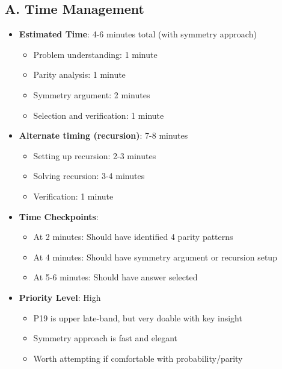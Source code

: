 \documentclass[12pt]{article}
\begin{document}
\begin{competitionbox}
\subsection*{A. Time Management}
\begin{itemize}[leftmargin=*]
    \item \textbf{Estimated Time}: 4-6 minutes total (with symmetry approach)
    \begin{itemize}
        \item Problem understanding: 1 minute
        \item Parity analysis: 1 minute
        \item Symmetry argument: 2 minutes
        \item Selection and verification: 1 minute
    \end{itemize}
    \item \textbf{Alternate timing (recursion)}: 7-8 minutes
    \begin{itemize}
        \item Setting up recursion: 2-3 minutes
        \item Solving recursion: 3-4 minutes
        \item Verification: 1 minute
    \end{itemize}
    \item \textbf{Time Checkpoints}: 
    \begin{itemize}
        \item At 2 minutes: Should have identified 4 parity patterns
        \item At 4 minutes: Should have symmetry argument or recursion setup
        \item At 5-6 minutes: Should have answer selected
    \end{itemize}
    \item \textbf{Priority Level}: High
    \begin{itemize}
        \item P19 is upper late-band, but very doable with key insight
        \item Symmetry approach is fast and elegant
        \item Worth attempting if comfortable with probability/parity
    \end{itemize}
\end{itemize}


\end{competitionbox}
\end{document}

